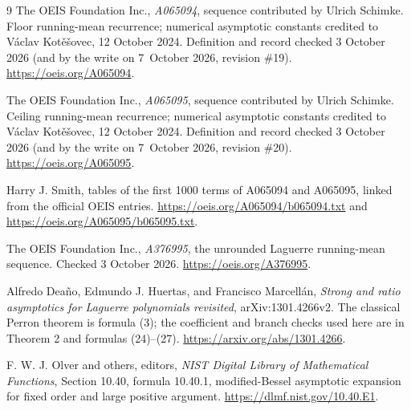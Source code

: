 \documentclass[11pt]{article}
\theoremstyle{remark}\newtheorem{remark}[theorem]{Remark}
\begin{document}
\begin{thebibliography}{9}
The OEIS Foundation Inc., \emph{A065094}, sequence contributed by Ulrich Schimke. Floor running-mean recurrence; numerical asymptotic constants credited to V\'aclav Kot\v e\v sovec, 12 October 2024. Definition and record checked 3 October 2026 (and by the write on 7~October 2026, revision \#19).
\url{https://oeis.org/A065094}.

The OEIS Foundation Inc., \emph{A065095}, sequence contributed by Ulrich Schimke. Ceiling running-mean recurrence; numerical asymptotic constants credited to V\'aclav Kot\v e\v sovec, 12 October 2024. Definition and record checked 3 October 2026 (and by the write on 7~October 2026, revision \#20).
\url{https://oeis.org/A065095}.

Harry J. Smith, tables of the first 1000 terms of A065094 and A065095, linked from the official OEIS entries.
\url{https://oeis.org/A065094/b065094.txt} and
\url{https://oeis.org/A065095/b065095.txt}.

The OEIS Foundation Inc., \emph{A376995}, the unrounded Laguerre running-mean sequence. Checked 3 October 2026.
\url{https://oeis.org/A376995}.

Alfredo Dea\~no, Edmundo J. Huertas, and Francisco Marcell\'an,
\emph{Strong and ratio asymptotics for Laguerre polynomials revisited},
arXiv:1301.4266v2. The classical Perron theorem is formula (3); the coefficient and branch checks used here are in Theorem 2 and formulas (24)--(27).
\url{https://arxiv.org/abs/1301.4266}.

F. W. J. Olver and others, editors, \emph{NIST Digital Library of Mathematical Functions}, Section 10.40, formula 10.40.1, modified-Bessel asymptotic expansion for fixed order and large positive argument.
\url{https://dlmf.nist.gov/10.40.E1}.
\end{thebibliography}
\end{document}
